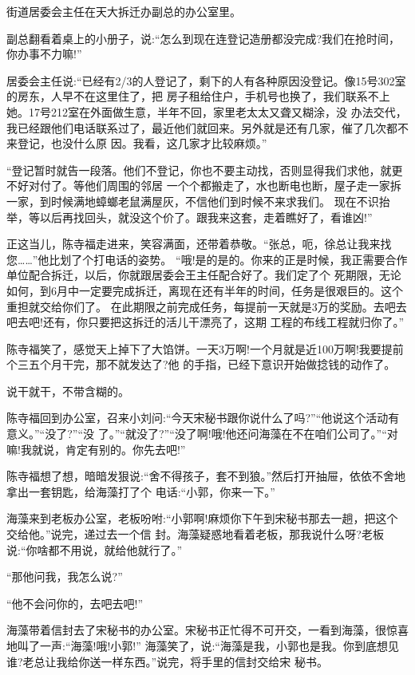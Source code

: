 \documentclass[11pt,a4paper,onecolumn]{article}
\begin{document}
街道居委会主任在天大拆迁办副总的办公室里。

副总翻看着桌上的小册子，说:``怎么到现在连登记造册都没完成?我们在抢时间，你办事不力嘛!''

居委会主任说:``已经有2/3的人登记了，剩下的人有各种原因没登记。像15号302室的房东，人早不在这里住了，把
房子租给住户，手机号也换了，我们联系不上她。17号212室在外面做生意，半年不回，家里老太太又聋又糊涂，没
办法交代，我已经跟他们电话联系过了，最近他们就回来。另外就是还有几家，催了几次都不来登记，也没什么原
因。我看，这几家才比较麻烦。''

``登记暂时就告一段落。他们不登记，你也不要主动找，否则显得我们求他，就更不好对付了。等他们周围的邻居
一个个都搬走了，水也断电也断，屋子走一家拆一家，到时候满地蟑螂老鼠满屋灰，不信他们到时候不来求我们。
现在不识抬举，等以后再找回头，就没这个价了。跟我来这套，走着瞧好了，看谁凶!''

正这当儿，陈寺福走进来，笑容满面，还带着恭敬。``张总，呃，徐总让我来找您……''他比划了个打电话的姿势。
``哦!是的是的。你来的正是时候，我正需要合作单位配合拆迁，以后，你就跟居委会王主任配合好了。我们定了个
死期限，无论如何，到6月中一定要完成拆迁，离现在还有半年的时间，任务是很艰巨的。这个重担就交给你们了。
在此期限之前完成任务，每提前一天就是3万的奖励。去吧去吧去吧!还有，你只要把这拆迁的活儿干漂亮了，这期
工程的布线工程就归你了。''

陈寺福笑了，感觉天上掉下了大馅饼。一天3万啊!一个月就是近100万啊!我要提前个三五个月干完，那不就发达了?他
的手指，已经下意识开始做捻钱的动作了。

说干就干，不带含糊的。

陈寺福回到办公室，召来小刘问:``今天宋秘书跟你说什么了吗?''``他说这个活动有意义。''``没了?''``没
了。''``就没了?''``没了啊!哦!他还问海藻在不在咱们公司了。''``对嘛!我就说，肯定有别的。你先去吧!''

陈寺福想了想，暗暗发狠说:``舍不得孩子，套不到狼。''然后打开抽屉，依依不舍地拿出一套钥匙，给海藻打了个
电话:``小郭，你来一下。''

海藻来到老板办公室，老板吩咐:``小郭啊!麻烦你下午到宋秘书那去一趟，把这个交给他。''说完，递过去一个信
封。海藻疑惑地看着老板，那我说什么呀?老板说:``你啥都不用说，就给他就行了。''

``那他问我，我怎么说?''

``他不会问你的，去吧去吧!''

海藻带着信封去了宋秘书的办公室。宋秘书正忙得不可开交，一看到海藻，很惊喜地叫了一声:``海藻!哦!小郭!''
海藻笑了，说:``海藻是我，小郭也是我。你到底想见谁?老总让我给你送一样东西。''说完，将手里的信封交给宋
秘书。
\end{document}
